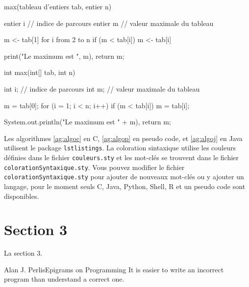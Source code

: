 \begin{algorithm}
  \begin{PseudoCode}
    max(tableau d'entiers tab, entier n) {
        entier i // indice de parcours
        entier m // valeur maximale du tableau

        m <- tab[1]
        for i from 2 to n {
            if (m < tab[i]) {
                m <- tab[i]
              }
          }

        print("Le maximum est ", m),
        return m;
      }
  \end{PseudoCode}
  \caption[Algo en PseudoCode]{Retourne la valeur maximale du tableau tab.\label{ag:algop}}
\end{algorithm}

\begin{algorithm}
  \begin{Java}
    int max(int[] tab, int n) {
        int i; // indice de parcours
        int m; // valeur maximale du tableau

        m = tab[0];
        for (i = 1; i < n; i++) {
            if (m < tab[i]) {
                m = tab[i];
              }
          }

        System.out.println("Le maximum est " + m),
        return m;
      }
  \end{Java}
  \caption[Algo en Java]{Retourne la valeur maximale du tableau tab.\label{ag:algoj}}
\end{algorithm}

Les algorithmes \ref{ag:algoc} en C, \ref{ag:algop} en pseudo code, et \ref{ag:algoj} en Java utilisent le package \texttt{lstlistings}. La coloration sintaxique utilise les couleurs définies dans le fichier \texttt{couleurs.sty} et les mot-clés se trouvent dans le fichier \texttt{colorationSyntaxique.sty}. Vous pouvez modifier le fichier \texttt{colorationSyntaxique.sty} pour ajouter de nouveaux mot-clés ou y ajouter un langage, pour le moment seuls C, Java, Python, Shell, R et un pseudo code sont disponibles.

\section{Section 3}

La section 3.

\begin{epigraphe}[english]{Alan J. Perlis}{Epigrams on Programming}
  It is easier to write an incorrect program than understand a correct one.
\end{epigraphe}

